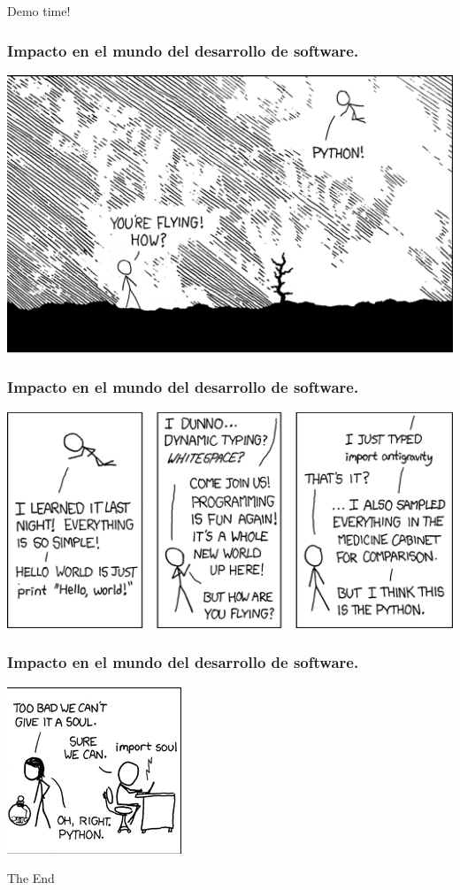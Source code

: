 \documentclass{beamer}
\begin{document}
\begin{frame}
Demo time!
\end{frame}

\begin{frame}
\frametitle{Impacto en el mundo del desarrollo de software.}
\includegraphics[width=0.9\linewidth]{python_1.png}
\end{frame}

\begin{frame}
\frametitle{Impacto en el mundo del desarrollo de software.}
\includegraphics[width=0.9\linewidth]{python_2.png}
\end{frame}

\begin{frame}
\frametitle{Impacto en el mundo del desarrollo de software.}
\begin{center}
\includegraphics[height=0.75\textheight]{new_pet_cropped.png}
\end{center}
\end{frame}

\begin{frame}
\Huge{\centerline{The End}}
\end{frame}

\end{document}
